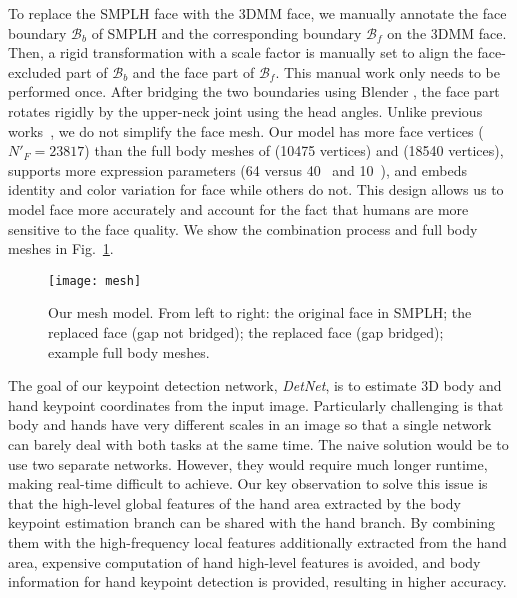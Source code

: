 \documentclass[final]{cvpr}
\begin{document}
To replace the SMPLH face with the 3DMM face, we manually annotate the face boundary $\mathcal{B}_b$ of SMPLH and the corresponding boundary $\mathcal{B}_f$ on the 3DMM face.
Then, a rigid transformation with a scale factor is manually set to align the face-excluded part of $\mathcal{B}_b$ and the face part of $\mathcal{B}_f$.
This manual work only needs to be performed once.
After bridging the two boundaries using Blender \cite{blender}, the face part rotates rigidly by the upper-neck joint using the head angles.
Unlike previous works~\cite{pavlakos2019expressive,joo2018total}, we do not simplify the face mesh.
Our model has more face vertices ($N'_F = 23817$) than the full body meshes of \cite{choutas2020monocular,pavlakos2019expressive} (10475 vertices) and \cite{joo2018total,xiang2019monocular} (18540 vertices), supports more expression parameters (64 versus 40~\cite{joo2018total,xiang2019monocular} and 10~\cite{choutas2020monocular,pavlakos2019expressive}), and embeds identity and color variation for face while others do not.
This design allows us to model face more accurately and account for the fact that humans are more sensitive to the face quality.
We show the combination process and full body meshes in Fig.~\ref{fig:mesh}.
\begin{figure}[t]
  \centering
  \texttt{[image: mesh]}
  \caption{
Our mesh model.
From left to right:
the original face in SMPLH;
the replaced face (gap not bridged);
the replaced face (gap bridged);
example full body meshes.
}
  \label{fig:mesh}
\end{figure}
\label{sec:DetNet}
The goal of our keypoint detection network, \textit{DetNet}, is to estimate 3D body and hand keypoint coordinates from the input image.
Particularly challenging is that body and hands have very different scales in an image so that a single network can barely deal with both tasks at the same time.
The naive solution would be to use two separate networks.
However, they would require much longer runtime, making real-time difficult to achieve.
Our key observation to solve this issue is that the high-level global features of the hand area extracted by the body keypoint estimation branch can be shared with the hand branch.
By combining them with the high-frequency local features additionally extracted from the hand area, expensive computation of hand high-level features is avoided, and body information for hand keypoint detection is provided, resulting in higher accuracy.
\par
\vspace{-3mm}
\end{document}
